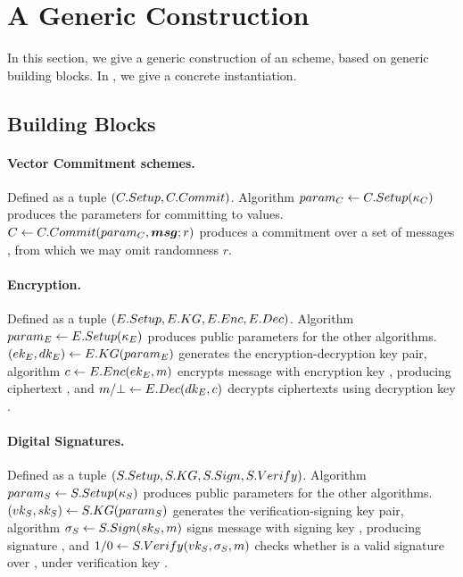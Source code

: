 \section{A Generic \UAS Construction}
\label{sec:gen-construction}

In this section, we give a generic construction of an \UAS scheme, based on
generic building blocks. In , we give a concrete
instantiation.

\subsection{Building Blocks}
\label{ssec:bblocks}

\paragraph{Vector Commitment schemes.} %
Defined as a tuple $(C.Setup,C.Commit)$. Algorithm $param_C \gets
C.Setup(\kappa_{C})$ produces the parameters for committing to values. $C
\gets C.Commit(param_C, \boldsymbol{msg}; r)$ produces a commitment \Ccom over a set of
messages \msgset, from which we may omit randomness $r$. 

\paragraph{Encryption.} %
Defined as a tuple $(E.Setup,E.KG,E.Enc,E.Dec)$. Algorithm $param_{E} \gets
E.Setup(\kappa_{E})$ produces public parameters for the other algorithms.
$(ek_{E},dk_{E}) \gets E.KG(param_{E})$ generates the encryption-decryption key
pair, algorithm $c \gets E.Enc(ek_{E},m)$ encrypts message \msg with
encryption key \Eek, producing ciphertext \Ec, and $m/\bot \gets E.Dec(dk_{E},
c)$ decrypts ciphertexts using decryption key \Edk. 

\paragraph{Digital Signatures.} %
Defined as a tuple $(S.Setup,S.KG,S.Sign,S.Verify)$. Algorithm $param_{S} \gets
S.Setup(\kappa_{S})$ produces public parameters for the other algorithms.
$(vk_{S},sk_{S}) \gets S.KG(param_{S})$ generates the verification-signing key
pair, algorithm $\sigma_{S} \gets S.Sign(sk_{S},m)$ signs message \msg with
signing key \Ssk, producing signature \Ssig, and $1/0 \gets S.Verify(vk_{S},
\sigma_{S},m)$ checks whether \Ssig is a valid signature over \msg, under
verification key \Svk. 

